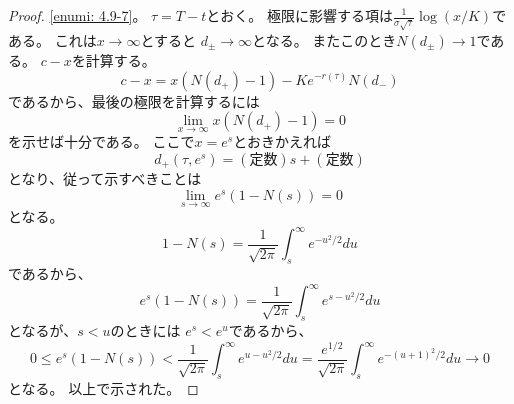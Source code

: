 \documentclass[uplatex]{jsarticle}
\theoremstyle{definition}
\begin{document}
\begin{proof}
  \ref{enumi: 4.9-7}。
  \(\tau = T-t\)とおく。
  極限に影響する項は\(\frac{1}{\sigma\sqrt{\tau}}\log(x/K)\)である。
  これは\(x\to \infty\)とすると
  \(d_{\pm}\to \infty\)となる。
  またこのとき\(N(d_{\pm})\to 1\)である。
  \(c-x\)を計算する。
  \[
  c - x = x(N(d_+)-1) - Ke^{-r(\tau)}N(d_-)
  \]
  であるから、最後の極限を計算するには
  \[
  \lim _{x\to \infty}x(N(d_+)-1) = 0
  \]
  を示せば十分である。
  ここで\(x=e^s\)とおきかえれば
  \[d_+(\tau,e^s) = (\text{定数})s + (\text{定数})\]
  となり、従って示すべきことは
  \[
  \lim _{s\to \infty} e^s(1 - N(s)) = 0
  \]
  となる。
  \[
  1 - N(s) = \frac{1}{\sqrt{2\pi}}\int_s^{\infty}e^{-u^2/2}du
  \]
  であるから、
  \[
  e^s(1-N(s)) = \frac{1}{\sqrt{2\pi}}\int_s^{\infty}e^{s-u^2/2}du
  \]
  となるが、\(s < u\)のときには
  \(e^s < e^u\)であるから、
  \[
  0 \leq e^s(1-N(s))
  < \frac{1}{\sqrt{2\pi}}\int_s^{\infty}e^{u-u^2/2}du
  = \frac{e^{1/2}}{\sqrt{2\pi}}\int_s^{\infty}e^{-(u+1)^2/2}du
  \to 0
  \]
  となる。
  以上で示された。
\end{proof}
\end{document}
